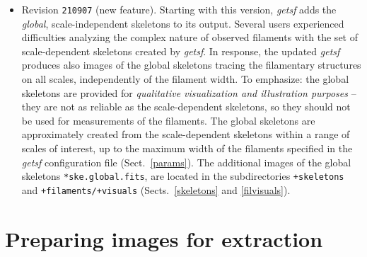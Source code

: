 \documentclass[a4paper,10pt]{article}
\begin{document}
\begin{itemize}
\item Revision \verb!210907! (new feature). Starting with this version, \textsl{getsf} adds the \emph{global}, scale-independent
skeletons to its output. Several users experienced difficulties analyzing the complex nature of observed filaments with the set of
scale-dependent skeletons created by \textsl{getsf}. In response, the updated \textsl{getsf} produces also images of the global
skeletons tracing the filamentary structures on all scales, independently of the filament width. To emphasize: the global skeletons
are provided for \emph{qualitative visualization and illustration purposes} -- they are not as reliable as the scale-dependent
skeletons, so they should not be used for measurements of the filaments. The global skeletons are approximately created from the
scale-dependent skeletons within a range of scales of interest, up to the maximum width of the filaments specified in the
\textsl{getsf} configuration file (Sect.~\ref{params}). The additional images of the global skeletons \verb!*ske.global.fits!, are
located in the subdirectories \verb!+skeletons! and \verb!+filaments/+visuals! (Sects.~\ref{skeletons} and \ref{filvisuals}).

\end{itemize}


\section{Preparing images for extraction}
\label{preparation}
\end{document}

